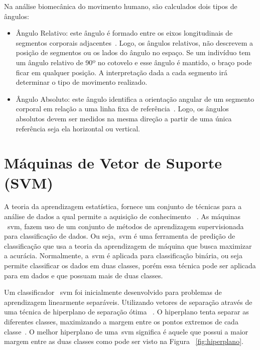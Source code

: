 Na análise biomecânica do movimento humano, são calculados dois tipos de ângulos:
	\begin{itemize}
		\item Ângulo Relativo: este ângulo é formado entre os eixos longitudinais de segmentos corporais adjacentes~\cite{hamill1999bases}. Logo, os ângulos relativos, não descrevem a posição de segmentos ou os lados do ângulo no espaço. Se um indivíduo tem um ângulo relativo de 90º no cotovelo e esse ângulo é mantido, o braço pode ficar em qualquer posição. A interpretação dada a cada segmento irá determinar o tipo de movimento realizado. 
		\item Ângulo Absoluto: este ângulo identifica a orientação angular de um segmento corporal em relação a uma linha fixa de referência~\cite{hamill1999bases}. Logo, os ângulos absolutos devem ser medidos na mesma direção a partir de uma única referência seja ela horizontal ou vertical.
	\end{itemize}



\section{Máquinas de Vetor de Suporte (SVM)}\label{sec:svm_linear}
A teoria da aprendizagem estatística, fornece um conjunto de técnicas para a análise de dados a qual permite a aquisição de conhecimento ~\cite{vapnik95}. As máquinas ~\ac{svm}, fazem uso de um conjunto de métodos de aprendizagem supervisionada para classificação de dados. Ou seja,~\ac{svm} é uma ferramenta de predição de classificação que usa a teoria da aprendizagem de máquina que busca maximizar a acurácia. Normalmente, a~\ac{svm} é aplicada para classificação binária, ou seja permite classificar os dados em duas classes, porém essa técnica pode ser aplicada para em dados e que possuam mais de duas classes.

Um classificador ~\ac{svm} foi inicialmente desenvolvido para problemas de aprendizagem linearmente separáveis. Utilizando vetores de separação através de uma técnica de hiperplano de separação ótima ~\cite{vapnik95}. O hiperplano tenta separar as diferentes classes, maximizando a margem entre os pontos extremos de cada classe~\cite{valt2010}. O melhor hiperplano de uma~\ac{svm} significa é aquele que possui a maior margem entre as duas classes como pode ser visto na Figura ~\ref{fig:hiperplano}.  

